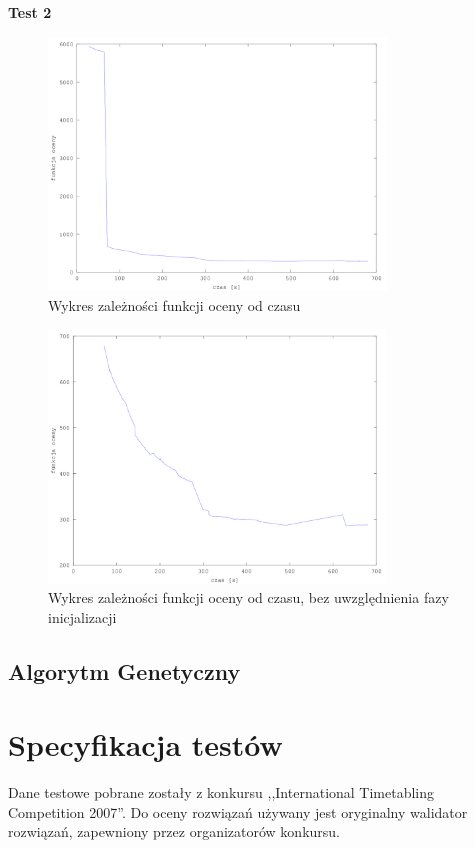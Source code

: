 \par \textbf{Test 2}
\begin{figure}[H]
  \caption{Wykres zależności funkcji oceny od czasu}
  \centering
    \includegraphics[width=0.8\textwidth]{ogolny2_instancja.png}
\end{figure}
\begin{figure}[H]
  \caption{Wykres zależności funkcji oceny od czasu, bez uwzględnienia fazy inicjalizacji}
  \centering
    \includegraphics[width=0.8\textwidth]{szczegolowy2_instancja.png}
\end{figure}
\subsection{Algorytm Genetyczny}
\section{Specyfikacja testów}
Dane testowe pobrane zostały z konkursu ,,International Timetabling Competition 2007''. Do oceny rozwiązań używany jest oryginalny walidator rozwiązań, zapewniony przez organizatorów konkursu.

